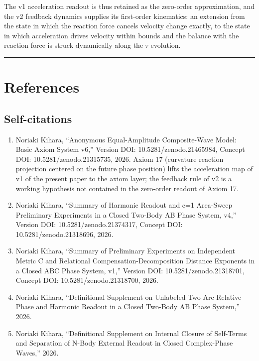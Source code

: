 \documentclass[
  a4paper,
]{article}
\providecommand{\tightlist}{%
  \setlength{\itemsep}{0pt}\setlength{\parskip}{0pt}}
\begin{document}
The v1 acceleration readout is thus retained as the zero-order
approximation, and the v2 feedback dynamics supplies its first-order
kinematics: an extension from the state in which the reaction force
cancels velocity change exactly, to the state in which acceleration
drives velocity within bounds and the balance with the reaction force is
struck dynamically along the \(\tau\) evolution.

\begin{center}\rule{0.5\linewidth}{0.5pt}\end{center}

\section{References}\label{references}

\subsection{Self-citations}\label{self-citations}

\begin{enumerate}
\def\labelenumi{\arabic{enumi}.}
\tightlist
\item
  Noriaki Kihara, ``Anonymous Equal-Amplitude Composite-Wave Model:
  Basic Axiom System v6,'' Version DOI: 10.5281/zenodo.21465984, Concept
  DOI: 10.5281/zenodo.21315735, 2026. Axiom 17 (curvature reaction
  projection centered on the future phase position) lifts the
  acceleration map of v1 of the present paper to the axiom layer; the
  feedback rule of v2 is a working hypothesis not contained in the
  zero-order readout of Axiom 17.
\item
  Noriaki Kihara, ``Summary of Harmonic Readout and c=1 Area-Sweep
  Preliminary Experiments in a Closed Two-Body AB Phase System, v4,''
  Version DOI: 10.5281/zenodo.21374317, Concept DOI:
  10.5281/zenodo.21318696, 2026.
\item
  Noriaki Kihara, ``Summary of Preliminary Experiments on Independent
  Metric C and Relational Compensation-Decomposition Distance Exponents
  in a Closed ABC Phase System, v1,'' Version DOI:
  10.5281/zenodo.21318701, Concept DOI: 10.5281/zenodo.21318700, 2026.
\item
  Noriaki Kihara, ``Definitional Supplement on Unlabeled Two-Arc
  Relative Phase and Harmonic Readout in a Closed Two-Body AB Phase
  System,'' 2026.
\item
  Noriaki Kihara, ``Definitional Supplement on Internal Closure of
  Self-Terms and Separation of N-Body External Readout in Closed
  Complex-Phase Waves,'' 2026.
\end{enumerate}
\end{document}

